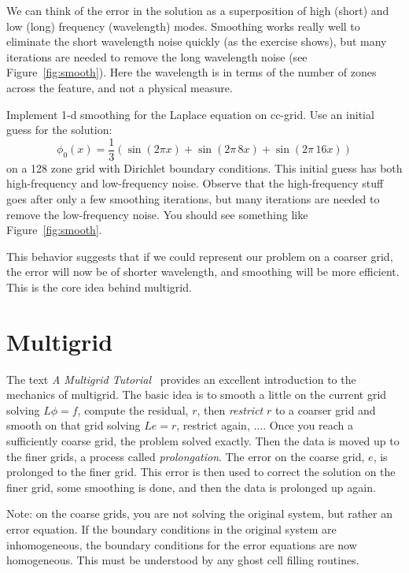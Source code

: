 We can think of the error in the solution as a superposition of high
(short) and low (long) frequency (wavelength) modes.  Smoothing works
really well to eliminate the short wavelength noise quickly (as the
exercise shows), but many iterations are needed to remove the long
wavelength noise (see Figure~\ref{fig:smooth}).  Here the wavelength
is in terms of the number of zones across the feature, and not a
physical measure.  

\begin{exercise}
{Implement 1-d smoothing for the Laplace equation on
  cc-grid.  Use an initial guess for the solution:
  \begin{equation}
  \phi_0(x) = \frac{1}{3} ( \sin(2\pi x) + \sin(2\pi \, 8 x) + \sin(2\pi \, 16 x) )
  \end{equation}
  on a 128 zone grid with Dirichlet boundary conditions.  This initial
  guess has both high-frequency and low-frequency noise.  Observe that
  the high-frequency stuff goes after only a few smoothing iterations,
  but many iterations are needed to remove the low-frequency noise.
  You should see something like Figure~\ref{fig:smooth}.
}
\end{exercise}

This behavior suggests that if we could represent our
problem on a coarser grid, the error will now be of shorter
wavelength, and smoothing will be more efficient.  This is the core
idea behind multigrid.



\section{Multigrid}

The text {\em A Multigrid Tutorial}~\cite{multigridtutorial} provides
an excellent introduction to the mechanics of multigrid.  The basic
idea is to smooth a little on the current grid solving $L\phi = f$,
compute the residual, $r$, then {\em restrict} $r$ to a coarser grid and
smooth on that grid solving $Le = r$, restrict again, $\ldots$.  Once
you reach a sufficiently coarse grid, the problem solved exactly.
Then the data is moved up to the finer grids, a process called {\em
  prolongation}.  The error on the coarse grid, $e$, is prolonged to
the finer grid.  This error is then used to correct the solution on
the finer grid, some smoothing is done, and then the data is prolonged
up again.

Note: on the coarse grids, you are not solving the original system,
but rather an error equation.  If the boundary conditions in the
original system are inhomogeneous, the boundary conditions for the
error equations are now homogeneous.  This must be understood by
any ghost cell filling routines.

